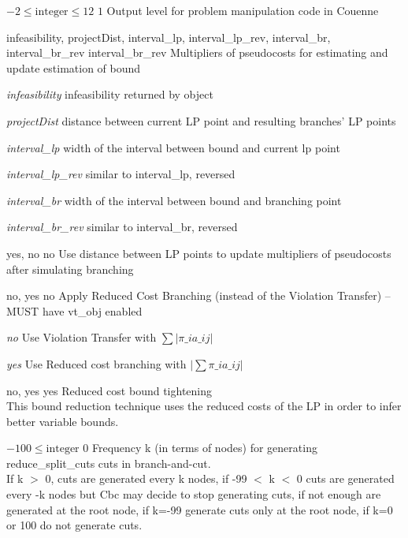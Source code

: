 %
{$-2\leq\textrm{integer}\leq12$}%
{$1$}%
{Output level for problem manipulation code in Couenne}%
{}

%
{infeasibility, projectDist, interval\_lp, interval\_lp\_rev, interval\_br, interval\_br\_rev}%
{interval\_br\_rev}%
{Multipliers of pseudocosts for estimating and update estimation of bound}%
{\begin{list}{}{
\setlength{\parsep}{0em}
\setlength{\leftmargin}{3ex}
\setlength{\labelwidth}{1ex}
\setlength{\itemindent}{0ex}
\setlength{\topsep}{0pt}}
\item[\textit{infeasibility}] infeasibility returned by object
\item[\textit{projectDist}] distance between current LP point and resulting branches' LP points
\item[\textit{interval\_lp}] width of the interval between bound and current lp point
\item[\textit{interval\_lp\_rev}] similar to interval\_lp, reversed
\item[\textit{interval\_br}] width of the interval between bound and branching point
\item[\textit{interval\_br\_rev}] similar to interval\_br, reversed
\end{list}
}

%
{yes, no}%
{no}%
{Use distance between LP points to update multipliers of pseudocosts after simulating branching}%
{}

%
{no, yes}%
{no}%
{Apply Reduced Cost Branching (instead of the Violation Transfer) -- MUST have vt\_obj enabled}%
{\begin{list}{}{
\setlength{\parsep}{0em}
\setlength{\leftmargin}{3ex}
\setlength{\labelwidth}{1ex}
\setlength{\itemindent}{0ex}
\setlength{\topsep}{0pt}}
\item[\textit{no}] Use Violation Transfer with $\sum |\pi\_i a\_{ij}|$
\item[\textit{yes}] Use Reduced cost branching with $|\sum \pi\_i a\_{ij}|$
\end{list}
}

%
{no, yes}%
{yes}%
{Reduced cost bound tightening\\
This bound reduction technique uses the reduced costs of the LP in order to infer better variable bounds.}%
{}

%
{$-100\leq\textrm{integer}$}%
{$0$}%
{Frequency k (in terms of nodes) for generating reduce\_split\_cuts cuts in branch-and-cut.\\
If k $>$ 0, cuts are generated every k nodes, if -99 $<$ k $<$ 0 cuts are generated every -k nodes but Cbc may decide to stop generating cuts, if not enough are generated at the root node, if k=-99 generate cuts only at the root node, if k=0 or 100 do not generate cuts.}%
{}

